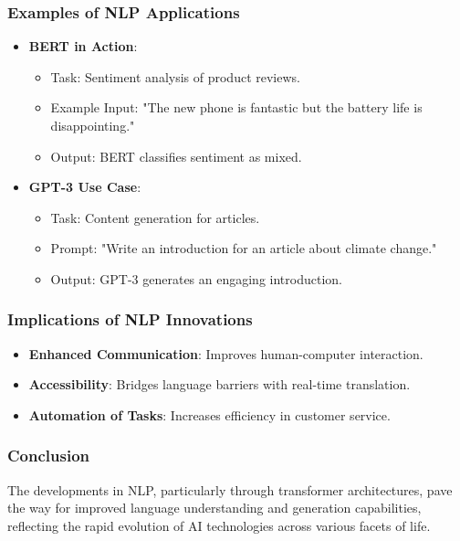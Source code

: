 \documentclass[aspectratio=169]{beamer}
\begin{document}
\begin{frame}
    \frametitle{Examples of NLP Applications}
    \begin{itemize}
        \item \textbf{BERT in Action}:
            \begin{itemize}
                \item Task: Sentiment analysis of product reviews.
                \item Example Input: "The new phone is fantastic but the battery life is disappointing."
                \item Output: BERT classifies sentiment as mixed.
            \end{itemize}
        \item \textbf{GPT-3 Use Case}:
            \begin{itemize}
                \item Task: Content generation for articles.
                \item Prompt: "Write an introduction for an article about climate change."
                \item Output: GPT-3 generates an engaging introduction.
            \end{itemize}
    \end{itemize}
\end{frame}

\begin{frame}
    \frametitle{Implications of NLP Innovations}
    \begin{itemize}
        \item \textbf{Enhanced Communication}: Improves human-computer interaction.
        \item \textbf{Accessibility}: Bridges language barriers with real-time translation.
        \item \textbf{Automation of Tasks}: Increases efficiency in customer service.
    \end{itemize}
\end{frame}

\begin{frame}[fragile]
    \frametitle{Conclusion}
    The developments in NLP, particularly through transformer architectures, pave the way for improved language understanding and generation capabilities, reflecting the rapid evolution of AI technologies across various facets of life.
\end{frame}
\end{document}
